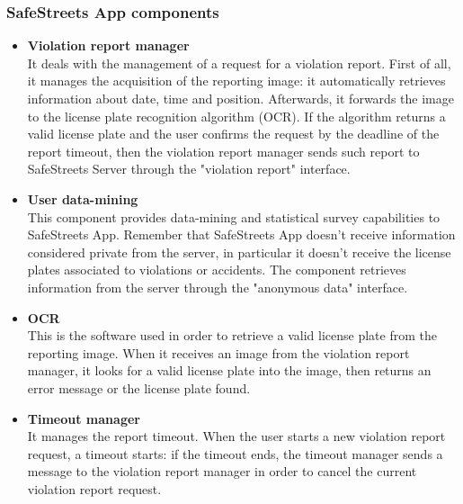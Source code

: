 \documentclass{article}
\begin{document}
		\subsubsection{SafeStreets App components}
		\begin{itemize}
			\item \textbf{Violation report manager}\\
			It deals with the management of a request for a violation report. First of all, it manages the acquisition of the reporting image: it automatically retrieves information about date, time and position. Afterwards, it forwards the image to the license plate recognition algorithm (OCR). If the algorithm returns a valid license plate and the user confirms the request by the deadline of the report timeout, then the violation report manager sends such report to SafeStreets Server through the "violation report" interface.
			\item \textbf{User data-mining}\\
			This component provides data-mining and statistical survey capabilities to SafeStreets App. Remember that SafeStreets App doesn't receive information considered private from the server, in particular it doesn't receive the license plates associated to violations or accidents. The component retrieves information from the server through the "anonymous data" interface.
			\item \textbf{OCR}\\
			This is the software used in order to retrieve a valid license plate from the reporting image. When it receives an image from the violation report manager, it looks for a valid license plate into the image, then returns an error message or the license plate found.
			\item \textbf{Timeout manager}\\
			It manages the report timeout. When the user starts a new violation report request, a timeout starts: if the timeout ends, the timeout manager sends a message to the violation report manager in order to cancel the current violation report request.
		\end{itemize}
\end{document}
